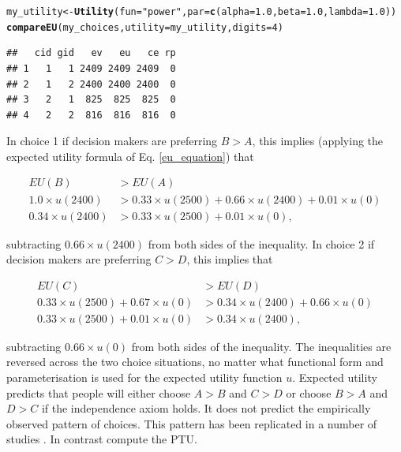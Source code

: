 \documentclass{article}\usepackage[]{graphicx}\usepackage[]{color}
\makeatletter
\newcommand{\hlnum}[1]{\textcolor[rgb]{0.686,0.059,0.569}{#1}}%
\newcommand{\hlstr}[1]{\textcolor[rgb]{0.192,0.494,0.8}{#1}}%
\newcommand{\hlstd}[1]{\textcolor[rgb]{0.345,0.345,0.345}{#1}}%
\newcommand{\hlkwb}[1]{\textcolor[rgb]{0.69,0.353,0.396}{#1}}%
\newcommand{\hlkwc}[1]{\textcolor[rgb]{0.333,0.667,0.333}{#1}}%
\newcommand{\hlkwd}[1]{\textcolor[rgb]{0.737,0.353,0.396}{\textbf{#1}}}%
\newenvironment{kframe}{%
 \def\at@end@of@kframe{}%
 \ifinner\ifhmode%
  \def\at@end@of@kframe{\end{minipage}}%
  \begin{minipage}{\columnwidth}%
 \fi\fi%
 \def\FrameCommand##1{\hskip\@totalleftmargin \hskip-\fboxsep
 \colorbox{shadecolor}{##1}\hskip-\fboxsep
     \hskip-\linewidth \hskip-\@totalleftmargin \hskip\columnwidth}%
 \MakeFramed {\advance\hsize-\width
   \@totalleftmargin\z@ \linewidth\hsize
   \@setminipage}}%
 {\par\unskip\endMakeFramed%
 \at@end@of@kframe}
\newenvironment{knitrout}{}{} %
\makeatother
\begin{document}
\begin{knitrout}
\color{fgcolor}\begin{kframe}
\begin{alltt}
\hlstd{my_utility} \hlkwb{<-} \hlkwd{Utility}\hlstd{(}\hlkwc{fun}\hlstd{=}\hlstr{"power"}\hlstd{,} \hlkwc{par}\hlstd{=}\hlkwd{c}\hlstd{(}\hlkwc{alpha}\hlstd{=}\hlnum{1.0}\hlstd{,} \hlkwc{beta}\hlstd{=}\hlnum{1.0}\hlstd{,} \hlkwc{lambda}\hlstd{=}\hlnum{1.0}\hlstd{))}
\hlkwd{compareEU}\hlstd{(my_choices,} \hlkwc{utility}\hlstd{=my_utility,} \hlkwc{digits}\hlstd{=}\hlnum{4}\hlstd{)}
\end{alltt}
\begin{verbatim}
##   cid gid   ev   eu   ce rp
## 1   1   1 2409 2409 2409  0
## 2   1   2 2400 2400 2400  0
## 3   2   1  825  825  825  0
## 4   2   2  816  816  816  0
\end{verbatim}
\end{kframe}
\end{knitrout}


In choice 1 if decision makers are preferring $B > A$, this implies (applying the expected utility formula of Eq. \eqref{eu_equation}) that

\begin{equation}
\begin{split}
EU(B) &> EU(A)\\
1.0 \times u(2400) &> 0.33 \times u(2500) + 0.66 \times u(2400) + 0.01 \times u(0)\\
0.34 \times u(2400) &> 0.33 \times u(2500) + 0.01 \times u(0),
\end{split}
\end{equation}

subtracting $0.66 \times u(2400)$ from both sides of the inequality.
In choice 2 if decision makers are preferring $C > D$, this implies that

\begin{equation}
\begin{split}
EU(C) &> EU(D)\\
0.33 \times u(2500) + 0.67 \times u(0) &> 0.34 \times u(2400) + 0.66 \times u(0)\\
0.33 \times u(2500) + 0.01 \times u(0) &> 0.34 \times u(2400),
\end{split}
\end{equation}

subtracting $0.66 \times u(0)$ from both sides of the inequality.
The inequalities are reversed across the two choice situations, no matter what functional form and parameterisation is used for the expected utility function $u$. Expected utility predicts that people will either choose $A > B$ and $C > D$ or choose $B > A$ and $D > C$ if the independence axiom holds. It does not predict the empirically observed pattern of choices. This pattern has been replicated in a number of studies \cite[e.g. see][]{MacCrimmon_Larsson_1979}. In contrast compute the PTU.
\end{document}

